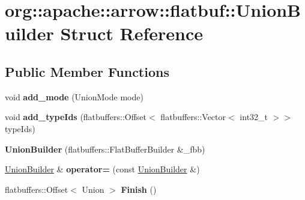 \hypertarget{structorg_1_1apache_1_1arrow_1_1flatbuf_1_1UnionBuilder}{}\section{org\+:\+:apache\+:\+:arrow\+:\+:flatbuf\+:\+:Union\+Builder Struct Reference}
\label{structorg_1_1apache_1_1arrow_1_1flatbuf_1_1UnionBuilder}
\subsection*{Public Member Functions}
\begin{DoxyCompactItemize}
\item 
void {\bfseries add\+\_\+mode} (Union\+Mode mode)\hypertarget{structorg_1_1apache_1_1arrow_1_1flatbuf_1_1UnionBuilder_a4d9fca506cbc8aed7dada2b6f9cdf07e}{}\label{structorg_1_1apache_1_1arrow_1_1flatbuf_1_1UnionBuilder_a4d9fca506cbc8aed7dada2b6f9cdf07e}

\item 
void {\bfseries add\+\_\+type\+Ids} (flatbuffers\+::\+Offset$<$ flatbuffers\+::\+Vector$<$ int32\+\_\+t $>$$>$ type\+Ids)\hypertarget{structorg_1_1apache_1_1arrow_1_1flatbuf_1_1UnionBuilder_a4e4897aa06621d21f494b763719b983e}{}\label{structorg_1_1apache_1_1arrow_1_1flatbuf_1_1UnionBuilder_a4e4897aa06621d21f494b763719b983e}

\item 
{\bfseries Union\+Builder} (flatbuffers\+::\+Flat\+Buffer\+Builder \&\+\_\+fbb)\hypertarget{structorg_1_1apache_1_1arrow_1_1flatbuf_1_1UnionBuilder_ac88822c2175e3fad0f89e6e4505e2d67}{}\label{structorg_1_1apache_1_1arrow_1_1flatbuf_1_1UnionBuilder_ac88822c2175e3fad0f89e6e4505e2d67}

\item 
\hyperlink{structorg_1_1apache_1_1arrow_1_1flatbuf_1_1UnionBuilder}{Union\+Builder} \& {\bfseries operator=} (const \hyperlink{structorg_1_1apache_1_1arrow_1_1flatbuf_1_1UnionBuilder}{Union\+Builder} \&)\hypertarget{structorg_1_1apache_1_1arrow_1_1flatbuf_1_1UnionBuilder_a5d9af97794c4b93461eda4460683cb81}{}\label{structorg_1_1apache_1_1arrow_1_1flatbuf_1_1UnionBuilder_a5d9af97794c4b93461eda4460683cb81}

\item 
flatbuffers\+::\+Offset$<$ Union $>$ {\bfseries Finish} ()\hypertarget{structorg_1_1apache_1_1arrow_1_1flatbuf_1_1UnionBuilder_a208998ca4cfd5e8fb8384e6fb40876eb}{}\label{structorg_1_1apache_1_1arrow_1_1flatbuf_1_1UnionBuilder_a208998ca4cfd5e8fb8384e6fb40876eb}

\end{DoxyCompactItemize}
